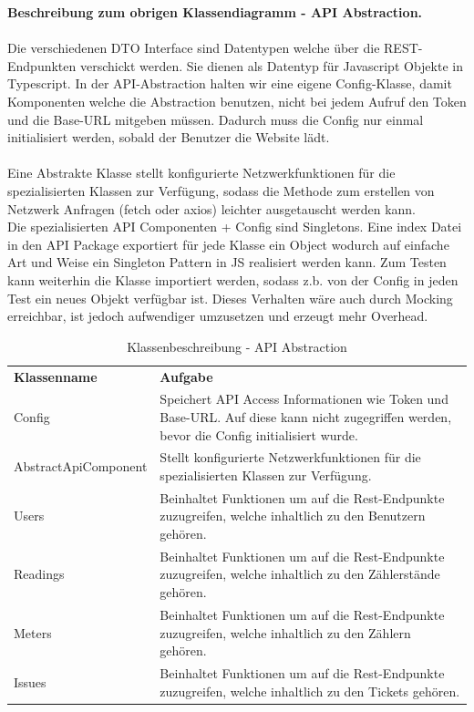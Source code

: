 \textbf{Beschreibung zum obrigen Klassendiagramm - API Abstraction.} \\ \\
Die verschiedenen DTO Interface sind Datentypen welche über die REST-Endpunkten verschickt werden. Sie dienen als Datentyp für Javascript Objekte in Typescript. In der API-Abstraction halten wir eine eigene Config-Klasse, damit Komponenten welche die Abstraction benutzen, nicht bei jedem Aufruf den Token und die Base-URL mitgeben müssen. Dadurch muss die Config nur einmal initialisiert werden, sobald der Benutzer die Website lädt. \\ \\
Eine Abstrakte Klasse stellt konfigurierte Netzwerkfunktionen für die spezialisierten Klassen zur Verfügung, sodass die Methode zum erstellen von Netzwerk Anfragen (fetch oder axios) leichter ausgetauscht werden kann. \\
Die spezialisierten API Componenten + Config sind Singletons. Eine index Datei in den API Package exportiert für
jede Klasse ein Object wodurch auf einfache Art und Weise ein Singleton Pattern in JS realisiert werden kann.
Zum Testen kann weiterhin die Klasse importiert werden, sodass z.b. von der Config in jeden Test ein neues
Objekt verfügbar ist. Dieses Verhalten wäre auch durch Mocking erreichbar, ist jedoch aufwendiger umzusetzen und erzeugt mehr Overhead. \\

\begin{table}[H]
	\centering
	\begin{tabularx}{\textwidth}{X X}
		\rowcolor[HTML]{C0C0C0} 
		\textbf{Klassenname} & \textbf{Aufgabe} \\
		Config& Speichert API Access Informationen wie Token und Base-URL. Auf diese kann nicht zugegriffen werden, bevor die Config initialisiert wurde.  \\
		\rowcolor[HTML]{E7E7E7} 
		AbstractApiComponent & Stellt konfigurierte Netzwerkfunktionen für die spezialisierten Klassen zur Verfügung. \\
		Users & Beinhaltet Funktionen um auf die Rest-Endpunkte zuzugreifen, welche inhaltlich zu den Benutzern gehören. \\
		\rowcolor[HTML]{E7E7E7} 
		Readings & Beinhaltet Funktionen um auf die Rest-Endpunkte zuzugreifen, welche inhaltlich zu den Zählerstände gehören. \\
		Meters & Beinhaltet Funktionen um auf die Rest-Endpunkte zuzugreifen, welche inhaltlich zu den Zählern gehören. \\
		\rowcolor[HTML]{E7E7E7} 
		Issues & Beinhaltet Funktionen um auf die Rest-Endpunkte zuzugreifen, welche inhaltlich zu den Tickets gehören. \\
	\end{tabularx}
	\caption{Klassenbeschreibung - API Abstraction}
	\label{table:klassenbeschreibung-api Abstraction}
\end{table}


